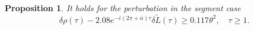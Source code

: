 \documentclass[reqno]{amsart}
\theoremstyle{definition} \newtheorem{definition}{Definition}[section]
\theoremstyle{definition} \newtheorem{remark}[definition]{Remark}
\theoremstyle{plain} \newtheorem{lemma}[definition]{Lemma}
\theoremstyle{plain} \newtheorem{proposition}[definition]{Proposition}
\theoremstyle{plain} \newtheorem{theorem}[definition]{Theorem}
\theoremstyle{plain} \newtheorem{corollary}[definition]{Corollary}
\theoremstyle{definition} \newtheorem{example}[definition]{Example}
\theoremstyle{plain} \newtheorem{claim}[clai]{Claim}
\theoremstyle{definition} \newtheorem{assumption}[definition]{Assumption}
\theoremstyle{definition} \newtheorem{observation}[definition]{Observation}
\newcommand{\1}{\mathbbm 1}
\numberwithin{equation}{section} %
\theoremstyle{plain} \newtheorem*{theorem*}{Theorem}
\theoremstyle{plain} \newtheorem{mthm}[maintheorem]{Main Theorem}
\theoremstyle{plain} \newtheorem*{mthm*}{Main Theorem}
\theoremstyle{plain} \newtheorem*{conjecture*}{Conjecture}
\theoremstyle{plain} \newtheorem{conjecture}[definition]{Conjecture}
\theoremstyle{plain} \newtheorem*{problem*}{Problem}
\begin{document}
\begin{proposition}
\label{Prop:lemgth_segm_pert}
It holds for the perturbation in the segment case
\begin{equation*}
\delta \rho(\tau) - 2.08 e^{- \bar c(2\pi + \bar \alpha) \tau} \delta \tilde L(\tau) \geq 0.117 \theta^2, \quad \tau \geq 1. %
\end{equation*}
\end{proposition}

%
%
\end{document}
